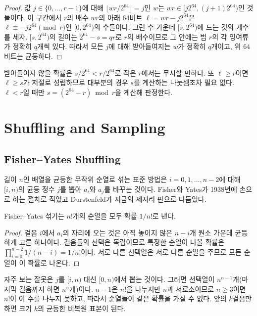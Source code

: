 \begin{proof}
값 $j\in\{0,\dots,r-1\}$에 대해 $\lfloor wr/2^{64}\rfloor=j$인 $w$는 $wr\in[j2^{64},(j+1)2^{64})$인 것들이다. 이 구간에서 $r$의 배수 $wr$의 아래 $64$비트 $\ell=wr-j2^{64}$은 $\ell\equiv-j2^{64}\pmod r$인 $[0,2^{64})$의 수들이다. 그런 수 가운데 $[s,2^{64})$에 드는 것의 개수를 세자. $[s,2^{64})$의 길이는 $2^{64}-s=qr$로 $r$의 배수이므로 그 안에는 법 $r$의 각 잉여류가 정확히 $q$개씩 있다. 따라서 모든 $j$에 대해 받아들여지는 $w$가 정확히 $q$개이고, 위 $64$비트는 균등하다.
\end{proof}

받아들이지 않을 확률은 $s/2^{64}<r/2^{64}$로 작은 $r$에서는 무시할 만하다. 또 $\ell\ge r$이면 $\ell\ge s$가 저절로 성립하므로 대부분의 경우 $s$를 계산하는 나눗셈조차 필요 없다. $\ell<r$일 때만 $s=(2^{64}-r)\bmod r$을 계산해 판정한다.

\section{Shuffling and Sampling}
\label{sec:shuffle}

\subsection{Fisher--Yates Shuffling}

길이 $n$인 배열을 균등한 무작위 순열로 섞는 표준 방법은 $i=0,1,\dots,n-2$에 대해 $[i,n)$의 균등 정수 $j$를 뽑아 $a_i$와 $a_j$를 바꾸는 것이다. Fisher와 Yates가 1938년에 손으로 하는 절차로 적었고\cite{fisher1938tables} Durstenfeld가 지금의 제자리 판으로 다듬었다\cite{durstenfeld1964}.

\begin{proposition}
Fisher--Yates 섞기는 $n!$개의 순열을 모두 확률 $1/n!$로 낸다.
\end{proposition}

\begin{proof}
걸음 $i$에서 $a_i$의 자리에 오는 것은 아직 놓이지 않은 $n-i$개 원소 가운데 균등하게 고른 하나이다. 걸음들의 선택은 독립이므로 특정한 순열이 나올 확률은 $\prod_{i=0}^{n-2}1/(n-i)=1/n!$이다. 서로 다른 선택열은 서로 다른 순열을 주므로 모든 순열이 이 확률로 나온다.
\end{proof}

자주 보는 잘못은 $j$를 $[i,n)$ 대신 $[0,n)$에서 뽑는 것이다. 그러면 선택열이 $n^{n-1}$개(마지막 걸음까지 하면 $n^n$개)이다. $n-1$은 $n!$을 나누지만 $n$과 서로소이므로 $n\ge3$이면 $n!$이 이 수를 나누지 못하고, 따라서 순열들이 같은 확률을 가질 수 없다. 앞의 $k$걸음만 하면 크기 $k$의 균등한 비복원 표본이 된다.

